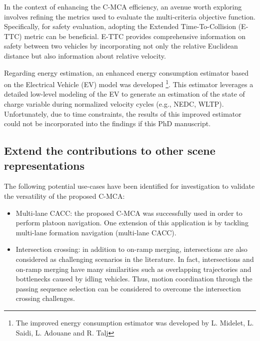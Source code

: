 In the context of enhancing the C-MCA efficiency, an avenue worth exploring involves refining the metrics used to evaluate the multi-criteria objective function. Specifically, for safety evaluation, adopting the Extended Time-To-Collision (E-TTC) \cite{dimiathesis} metric can be beneficial. E-TTC provides comprehensive information on safety between two vehicles by incorporating not only the relative Euclidean distance but also information about relative velocity. 


Regarding energy estimation, an enhanced energy consumption estimator based on the Electrical Vehicle (EV) model was developed  \footnote{The improved energy consumption estimator was developed by L. Midelet, L. Saidi, L. Adouane and R. Talj}. This estimator leverages a detailed low-level modeling of the EV to generate an estimation of the state of charge variable during normalized velocity cycles (e.g., NEDC, WLTP). Unfortunately, due to time constraints, the results of this improved estimator could not be incorporated into the findings if this PhD manuscript. 



\subsection*{Extend the contributions to other scene representations}

The following potential use-cases have been identified for investigation to validate the versatility of the proposed C-MCA:  

\begin{itemize}
    \item Multi-lane CACC: the proposed C-MCA was successfully used in order to perform platoon navigation. One extension of this application is by tackling multi-lane formation navigation (multi-lane CACC). 

    \item Intersection crossing: in addition to on-ramp merging, intersections are also considered as challenging scenarios in the literature. In fact, intersections and on-ramp merging have many similarities such as overlapping trajectories and bottlenecks caused by idling vehicles. Thus, motion coordination through the passing sequence selection can be considered to overcome the intersection crossing challenges. 
\end{itemize}








